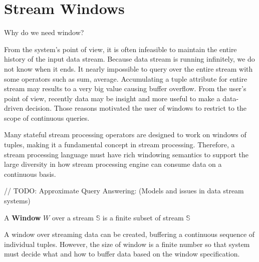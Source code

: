    
    
    
\section{Stream Windows}

Why do we need window?

From the system's point of view, it is often infeasible to maintain the entire history of the input data stream. Because data stream is running infinitely, we do not know when it ends. It nearly impossible to query over the entire stream with some operators such as sum, average. Accumulating a tuple attribute for entire stream may results to a very big value causing  buffer overflow. From the user's point of view, recently data may be insight and more useful to make a data-driven decision. Those reasons motivated the user of windows to restrict to the scope of continuous queries. 

Many stateful stream processing operators are designed to work on windows of tuples, making it a fundamental concept in stream processing. Therefore, a stream processing language must have rich windowing semantics to support the large diversity in how stream processing engine can consume data on a continuous basis.


// TODO: Approximate Query Answering: (Models and issues in data stream systems)

\begin{defi}
A \textbf{Window} $W$ over a stream $\mathbb{S}$ is a finite subset of stream $\mathbb{S}$ \cite{Dindar:2013}
\end{defi}


A window over streaming data can be created, buffering a continuous sequence of individual tuples. However, the size of window is a finite number so that system must decide what and how to buffer data based on the window specification. 

